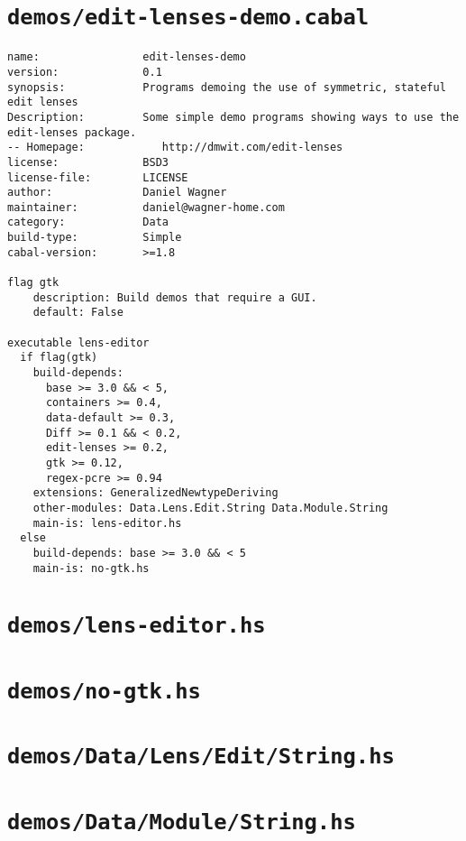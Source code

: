 \section{\texttt{demos/edit-lenses-demo.cabal}}
\begin{verbatim}
name:                edit-lenses-demo
version:             0.1
synopsis:            Programs demoing the use of symmetric, stateful edit lenses
Description:         Some simple demo programs showing ways to use the edit-lenses package.
-- Homepage:            http://dmwit.com/edit-lenses
license:             BSD3
license-file:        LICENSE
author:              Daniel Wagner
maintainer:          daniel@wagner-home.com
category:            Data
build-type:          Simple
cabal-version:       >=1.8

flag gtk
    description: Build demos that require a GUI.
    default: False

executable lens-editor
  if flag(gtk)
    build-depends:
      base >= 3.0 && < 5,
      containers >= 0.4,
      data-default >= 0.3,
      Diff >= 0.1 && < 0.2,
      edit-lenses >= 0.2,
      gtk >= 0.12,
      regex-pcre >= 0.94
    extensions: GeneralizedNewtypeDeriving
    other-modules: Data.Lens.Edit.String Data.Module.String
    main-is: lens-editor.hs
  else
    build-depends: base >= 3.0 && < 5
    main-is: no-gtk.hs
\end{verbatim}

\section{\texttt{demos/lens-editor.hs}}
\label{mod:lens-editor}


\section{\texttt{demos/no-gtk.hs}}
\label{mod:no-gtk}


\section{\texttt{demos/Data/Lens/Edit/String.hs}}
\label{mod:Data.Lens.Edit.String}


\section{\texttt{demos/Data/Module/String.hs}}
\label{mod:Data.Module.String}



